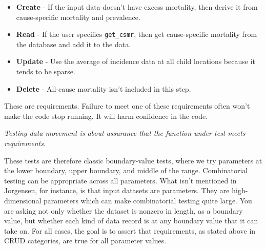\documentclass[fleqn,10pt]{olplainarticle}
\begin{document}
\begin{itemize}
\item \textbf{Create} - If the input data doesn't have excess mortality,
  then derive it from cause-specific mortality and prevalence.
\item \textbf{Read} - If the user specifies \texttt{get\_csmr}, then get cause-specific
  mortality from the database and add it to the data.
\item \textbf{Update} - Use the average of incidence data at all child
  locations because it tends to be sparse.
\item \textbf{Delete} - All-cause mortality isn't included in this step.
\end{itemize}

These are requirements. Failure to meet one of these requirements
often won't make the code stop running. It will harm confidence
in the code.

\emph{Testing data movement is about assurance that the
function under test meets requirements.}

These tests are therefore classic boundary-value tests, where
we try parameters at the lower boundary, upper boundary,
and middle of the range. Combinatorial testing can be appropriate
across all parameters. What isn't mentioned in Jorgensen, for instance,
is that input datasets are parameters. They are high-dimensional
parameters which can make combinatorial testing quite large.
You are asking not only whether the dataset is nonzero in length,
as a boundary value, but whether each kind of data record is at
any boundary value that it can take on. For all cases, the goal
is to assert that requirements, as stated above in CRUD categories,
are true for all parameter values.
\end{document}
